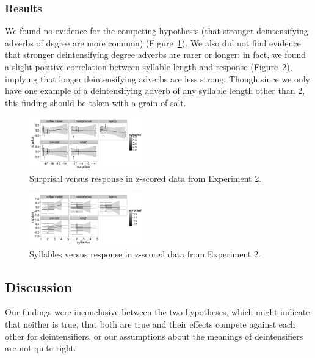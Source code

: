 \documentclass[10pt,letterpaper]{article}
\begin{document}
  \subsubsection{Results}     
    
    We found no evidence for the competing hypothesis (that stronger deintensifying adverbs of degree are more common) (Figure~\ref{exp2-zz}). We also did not find evidence that stronger deintensifying degree adverbs are rarer or longer: in fact, we found a slight positive correlation between syllable length and response (Figure~\ref{exp2-zz-syllables}), implying that longer deintensifying adverbs are less strong. Though since we only have one example of a deintensifying adverb of any syllable length other than 2, this finding should be taken with a grain of salt.
  
    \begin{figure}[ht]
    \begin{center}
    \includegraphics[width=0.45\textwidth]{exp2-zz.png}
    \end{center}
    \caption{Surprisal versus response in z-scored data from Experiment 2.} 
    \label{exp2-zz}
    \end{figure}
    
    \begin{figure}[ht]
    \begin{center}
    \includegraphics[width=0.45\textwidth]{exp2-zz-syllables.png}
    \end{center}
    \caption{Syllables versus response in z-scored data from Experiment 2.} 
    \label{exp2-zz-syllables}
    \end{figure}
    
  \subsection{Discussion}
  
    Our findings were inconclusive between the two hypotheses, which might indicate that neither is true, that both are true and their effects compete against each other for deintensifiers, or our assumptions about the meanings of deintensifiers are not quite right.
\end{document}
